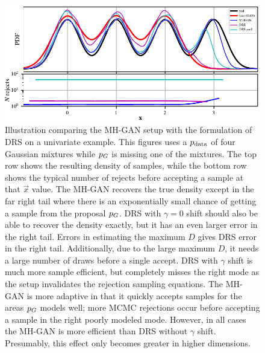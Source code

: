 \begin{figure}[htbp]
    \centering
    \includegraphics[scale=1.0]{figures/univariate_example.pdf}
    \caption{{\small
    Illustration comparing the MH-GAN setup with the formulation of DRS on a univariate example.
    This figures uses a ${p_{\textrm{data}}}$ of four Gaussian mixtures while ${p_G}$ is missing one of the mixtures.
    The top row shows the resulting density of samples, while the bottom row shows the typical number of rejects before accepting a sample at that $\vec x$ value.
    The MH-GAN recovers the true density except in the far right tail where there is an exponentially small chance of getting a sample from the proposal ${p_G}$.
    DRS with $\gamma=0$ shift should also be able to recover the density exactly, but it has an even larger error in the right tail.
    Errors in estimating the maximum $D$ gives DRS error in the right tail.
    Additionally, due to the large maximum $D$, it needs a large number of draws before a single accept.
    DRS with $\gamma$ shift is much more sample efficient, but completely misses the right mode as the setup invalidates the rejection sampling equations.
    The MH-GAN is more adaptive in that it quickly accepts samples for the areas ${p_G}$ models well; more MCMC rejections occur before accepting a sample in the right poorly modeled mode.
    However, in all cases the MH-GAN is more efficient than DRS without $\gamma$ shift.
    Presumably, this effect only becomes greater in higher dimensions.
    }}
    \label{fig:univariate_example}
\end{figure}

